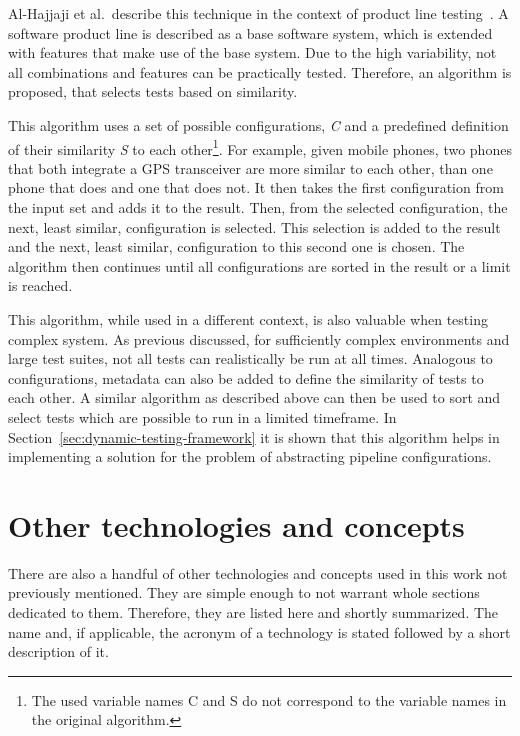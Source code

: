Al-Hajjaji et al.~describe this technique in the context of product line testing~\cite{SimilarityBasedPrioritizationInSoftwareProductLineTesting}.
A software product line is described as a base software system, which is extended with features that make use of the base system.
Due to the high variability, not all combinations and features can be practically tested.
Therefore, an algorithm is proposed, that selects tests based on similarity.

This algorithm uses a set of possible configurations, \textit{C} and a predefined definition of their similarity \textit{S} to each other\footnote{The used variable names C and S do not correspond to the variable names in the original algorithm.}.
For example, given mobile phones, two phones that both integrate a GPS transceiver are more similar to each other, than one phone that does and one that does not.
It then takes the first configuration from the input set and adds it to the result.
Then, from the selected configuration, the next, least similar, configuration is selected.
This selection is added to the result and the next, least similar, configuration to this second one is chosen.
The algorithm then continues until all configurations are sorted in the result or a limit is reached.

This algorithm, while used in a different context, is also valuable when testing complex system.
As previous discussed, for sufficiently complex environments and large test suites, not all tests can realistically be run at all times.
Analogous to configurations, metadata can also be added to define the similarity of tests to each other.
A similar algorithm as described above can then be used to sort and select tests which are possible to run in a limited timeframe.
In Section~\ref{sec:dynamic-testing-framework} it is shown that this algorithm helps in implementing a solution for the problem of abstracting pipeline configurations.

\section{Other technologies and concepts}\label{sec:technologies-used}

There are also a handful of other technologies and concepts used in this work not previously mentioned.
They are simple enough to not warrant whole sections dedicated to them.
Therefore, they are listed here and shortly summarized.
The name and, if applicable, the acronym of a technology is stated followed by a short description of it.

